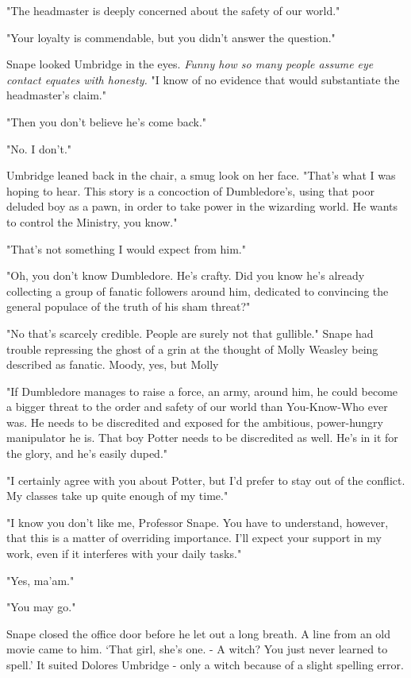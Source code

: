 "The headmaster is deeply concerned about the safety of our world."

"Your loyalty is commendable, but you didn't answer the question."

Snape looked Umbridge in the eyes. \emph{Funny how so many people assume eye contact equates with honesty.} "I know of no evidence that would substantiate the headmaster's claim."

"Then you don't believe he's come back."

"No. I don't."

Umbridge leaned back in the chair, a smug look on her face. "That's what I was hoping to hear. This story is a concoction of Dumbledore's, using that poor deluded boy as a pawn, in order to take power in the wizarding world. He wants to control the Ministry, you know."

"That's not something I would expect from him."

"Oh, you don't know Dumbledore. He's crafty. Did you know he's already collecting a group of fanatic followers around him, dedicated to convincing the general populace of the truth of his sham threat?"

"No{\el} that's scarcely credible. People are surely not that gullible." Snape had trouble repressing the ghost of a grin at the thought of Molly Weasley being described as fanatic. Moody, yes, but Molly{\el}

"If Dumbledore manages to raise a force, an army, around him, he could become a bigger threat to the order and safety of our world than You-Know-Who ever was. He needs to be discredited and exposed for the ambitious, power-hungry manipulator he is. That boy Potter needs to be discredited as well. He's in it for the glory, and he's easily duped."

"I certainly agree with you about Potter, but I'd prefer to stay out of the conflict. My classes take up quite enough of my time."

"I know you don't like me, Professor Snape. You have to understand, however, that this is a matter of overriding importance. I'll expect your support in my work, even if it interferes with your daily tasks."

"Yes, ma'am."

"You may go."

Snape closed the office door before he let out a long breath. A line from an old movie came to him. `That girl, she's one. - A witch? You just never learned to spell.' It suited Dolores Umbridge - only a witch because of a slight spelling error.

